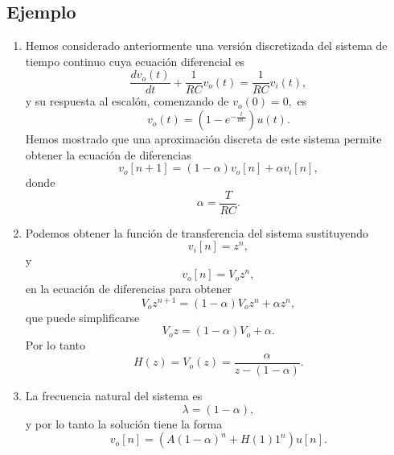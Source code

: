 \subsection{Ejemplo}

\begin{enumerate}

\item Hemos considerado anteriormente una versi\'{o}n discretizada del sistema de tiempo continuo cuya 
ecuaci\'{o}n diferencial es 
\begin{equation}
        \frac{dv_o\left( t\right) }{dt}+\frac{1}{RC}v_o\left( t\right) =\frac{1}{RC}v_i\left( t\right) ,
\end{equation}
y su respuesta al escal\'{o}n, comenzando de $v_o\left( 0\right) =0,$ es 
\begin{equation}
        v_o\left( t\right) =\left( 1-e^{-\frac{t}{RC}}\right) u\left( t\right) .
\end{equation}
Hemos mostrado que una aproximaci\'{o}n discreta de este sistema permite obtener la ecuaci\'{o}n de 
diferencias 
\begin{equation}
        v_o\left[ n+1\right] =\left( 1-\alpha \right) v_o\left[ n\right] +\alpha v_i\left[ n\right] ,
\end{equation}
donde 
\begin{equation}
        \alpha =\frac{T}{RC}.
\end{equation}

\item Podemos obtener la funci\'{o}n de transferencia del sistema sustituyendo 
\begin{equation}
        v_i\left[ n\right] =z^n,
\end{equation}
y 
\begin{equation}
        v_o\left[ n\right] =V_o z^n,
\end{equation}
en la ecuaci\'{o}n de diferencias para obtener 
\begin{equation}
        V_oz^{n+1}=\left( 1-\alpha \right) V_oz^n+\alpha z^n,
\end{equation}
que puede simplificarse 
\begin{equation}
        V_oz=\left( 1-\alpha \right) V_o+\alpha.
\end{equation}
Por lo tanto 
\begin{equation}
        H\left( z\right) = V_o\left( z\right) = \frac{\alpha }{z-\left( 1-\alpha \right) }.
\end{equation}

\item La frecuencia natural del sistema es 
\begin{equation}
        \lambda =\left( 1-\alpha \right) ,
\end{equation}
y por lo tanto la soluci\'{o}n tiene la forma 
\begin{equation}
     v_o\left[ n\right] =\left( A\left( 1-\alpha \right) ^n+H\left( 1\right) 1^n\right) u\left[ n\right] .
\end{equation}


\end{enumerate}
